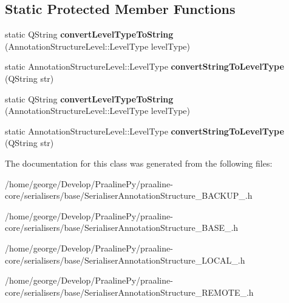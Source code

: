 \subsection*{Static Protected Member Functions}
\begin{DoxyCompactItemize}
\item 
\mbox{\label{class_praaline_1_1_core_1_1_serialiser_annotation_structure_ab12b423b1ffdbf1991a2f89d3abbfdb0}} 
static Q\+String {\bfseries convert\+Level\+Type\+To\+String} (Annotation\+Structure\+Level\+::\+Level\+Type level\+Type)
\item 
\mbox{\label{class_praaline_1_1_core_1_1_serialiser_annotation_structure_a501c3f2647f9be4483a77eff22db318d}} 
static Annotation\+Structure\+Level\+::\+Level\+Type {\bfseries convert\+String\+To\+Level\+Type} (Q\+String str)
\item 
\mbox{\label{class_praaline_1_1_core_1_1_serialiser_annotation_structure_ab12b423b1ffdbf1991a2f89d3abbfdb0}} 
static Q\+String {\bfseries convert\+Level\+Type\+To\+String} (Annotation\+Structure\+Level\+::\+Level\+Type level\+Type)
\item 
\mbox{\label{class_praaline_1_1_core_1_1_serialiser_annotation_structure_a501c3f2647f9be4483a77eff22db318d}} 
static Annotation\+Structure\+Level\+::\+Level\+Type {\bfseries convert\+String\+To\+Level\+Type} (Q\+String str)
\end{DoxyCompactItemize}


The documentation for this class was generated from the following files\+:\begin{DoxyCompactItemize}
\item 
/home/george/\+Develop/\+Praaline\+Py/praaline-\/core/serialisers/base/Serialiser\+Annotation\+Structure\+\_\+\+B\+A\+C\+K\+U\+P\+\_.\+h\item 
/home/george/\+Develop/\+Praaline\+Py/praaline-\/core/serialisers/base/Serialiser\+Annotation\+Structure\+\_\+\+B\+A\+S\+E\+\_.\+h\item 
/home/george/\+Develop/\+Praaline\+Py/praaline-\/core/serialisers/base/Serialiser\+Annotation\+Structure\+\_\+\+L\+O\+C\+A\+L\+\_.\+h\item 
/home/george/\+Develop/\+Praaline\+Py/praaline-\/core/serialisers/base/Serialiser\+Annotation\+Structure\+\_\+\+R\+E\+M\+O\+T\+E\+\_.\+h\end{DoxyCompactItemize}
